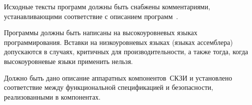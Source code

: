 \label{R.DI.Comments}
Исходные тексты программ должны быть снабжены комментариями,
устанавливающими соответствие с описанием программ~.

\label{R.DI.Language}
Программы должны быть написаны на высокоуровневых языках программирования.
Вставки на низкоуровневых языках (языках ассемблера) допускаются в случаях,
критичных для производительности, а также тогда, когда высокоуровневые языки
применить нельзя.

\begin{note*}
\end{note*}

\label{R.DI.HardSpec}
Должно быть дано описание аппаратных компонентов~СКЗИ и установлено соответствие
между функциональной спецификацией и  безопасности,
реализованными в компонентах.

